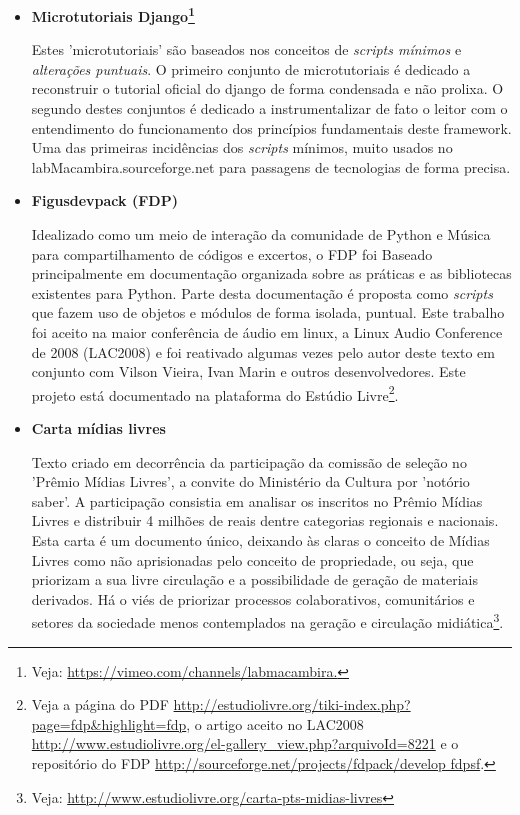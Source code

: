 \begin{itemize}
    \item {\bf Microtutoriais Django\footnote{Veja: \url{https://vimeo.com/channels/labmacambira.}} }

Estes 'microtutoriais' são baseados nos conceitos de \emph{scripts mínimos} e
\emph{alterações puntuais}. O primeiro conjunto de microtutoriais é dedicado
a reconstruir o tutorial oficial do django de forma condensada e não prolixa.
O segundo destes conjuntos é dedicado a instrumentalizar de fato o leitor com
o entendimento do funcionamento dos princípios fundamentais deste framework.
Uma das primeiras incidências dos \emph{scripts} mínimos, muito usados no
labMacambira.sourceforge.net para passagens de tecnologias de forma precisa.

     \item {\bf Figusdevpack (FDP)}

Idealizado como um meio de interação da comunidade de Python e Música 
para compartilhamento de códigos e excertos, o FDP foi Baseado principalmente
em documentação organizada sobre as práticas e as bibliotecas
existentes para Python. Parte desta documentação
é proposta como \emph{scripts} que
fazem uso de objetos e módulos de forma isolada, puntual.
 Este trabalho foi aceito na
maior conferência de áudio em linux, a Linux Audio Conference de 2008
(LAC2008) e foi reativado algumas vezes pelo autor deste texto
em conjunto com Vilson Vieira, Ivan Marin
e outros desenvolvedores. Este projeto está
documentado na plataforma do Estúdio Livre\footnote{
Veja a página do PDF \url{http://estudiolivre.org/tiki-index.php?page=fdp&highlight=fdp}, o artigo aceito no LAC2008 \url{http://www.estudiolivre.org/el-gallery_view.php?arquivoId=8221}
e o repositório do FDP \url{http://sourceforge.net/projects/fdpack/develop fdpsf}.}.


    \item {\bf Carta mídias livres}

Texto criado em decorrência da participação da comissão de seleção no
'Prêmio Mídias Livres', a convite do Ministério da Cultura por 'notório saber'. A participação consistia em analisar os inscritos no Prêmio Mídias Livres e distribuir 4 milhões de reais dentre categorias regionais e nacionais.
Esta carta é um documento único, deixando às claras
o conceito de Mídias Livres como não aprisionadas pelo conceito
de propriedade, ou seja, que priorizam a sua livre circulação e a possibilidade
de geração de materiais derivados. Há o viés de priorizar processos colaborativos, comunitários e setores da sociedade menos contemplados na geração e circulação midiática\footnote{Veja: \url{http://www.estudiolivre.org/carta-pts-midias-livres}}.


\end{itemize}
